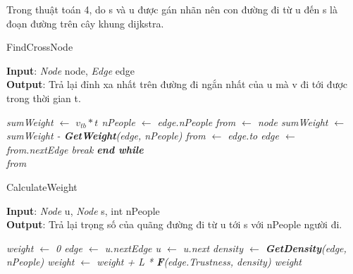     Trong thuật toán 4, do s và u được gán nhãn nên con đường đi từ u đến s là 
    đoạn đường trên cây khung dijkstra.
    \begin{algorithm}
        \caption{FindCrossNode}
        \textbf{Input}: \textit{Node} node, \textit{Edge} edge\\
        \textbf{Output}: Trả lại đỉnh xa nhất trên đường đi ngắn nhất của u mà v 
        đi tới được trong thời gian t. 
        \begin{algorithmic}
            \em
            \State sumWeight $\gets$ $v_{tb}*t$ 
            \State nPeople $\gets$ edge.nPeople
            \State from $\gets$ node
            \State sumWeight $\gets$ sumWeight - \textbf{GetWeight}(edge, nPeople)
            \State from $\gets$ edge.to
            \State edge $\gets$ from.nextEdge
             break
            \EndIf
            \EndWhile 
            \textbf{end while} \\
            \Return from
            \EndProcedure
        \end{algorithmic}
    \end{algorithm}


    \begin{algorithm}
        \caption{CalculateWeight}
        \textbf{Input}: \textit{Node} u, \textit{Node} s, int nPeople \\
        \textbf{Output}: Trả lại trọng số của quãng đường đi từ u tới s với 
        nPeople người đi.
        \begin{algorithmic}
            \em
            \State weight $\gets$ 0
            \State edge $\gets$ u.nextEdge
            \State u $\gets$ u.next
            \State density $\gets$ \textbf{GetDensity}(edge, nPeople)
            \State weight $\gets$ weight + L * \textbf{F}(edge.Trustness, density)
            \EndWhile
            \Return weight
            \EndProcedure
        \end{algorithmic}
    \end{algorithm}